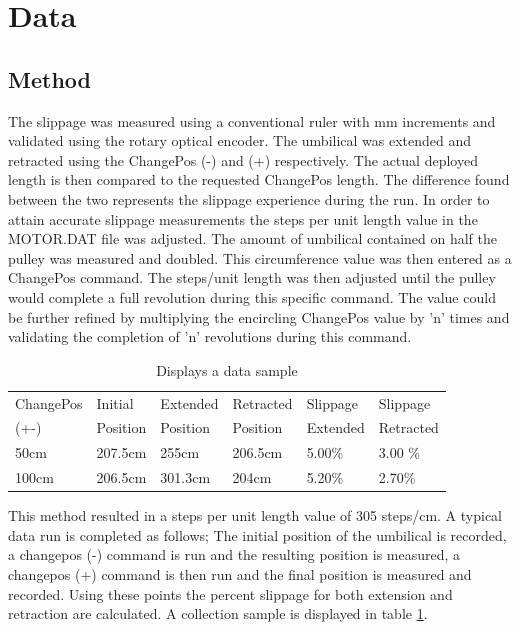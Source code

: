 \documentclass[paper=a4, fontsize=11pt]{scrartcl}
\numberwithin{equation}{section}		%
\numberwithin{figure}{section}			%
\numberwithin{table}{section}				%
\begin{document}
\section{Data}
\subsection{Method}
The slippage was measured using a conventional ruler with mm increments and validated using the rotary optical encoder. The umbilical was extended and retracted using the ChangePos (-) and (+) respectively. The actual deployed length is then compared to the requested ChangePos length. The difference found between the two represents the slippage experience during the run. In order to attain accurate slippage measurements the steps per unit length value in the MOTOR.DAT file was adjusted. The amount of umbilical contained on half the pulley was measured and doubled. This circumference value was then entered as a ChangePos command. The steps/unit length was then adjusted until the pulley would complete a full revolution during this specific command. The value could be further refined by multiplying the encircling ChangePos value by 'n' times and validating the completion of 'n' revolutions during this command. 

\begin{table}[H]
\begin{tabularx}{\textwidth}{ |X|X|X|X|X|X| }
\hline
ChangePos  & Initial  & Extended  & Retracted  & Slippage  & Slippage \\ 
 (+-) & Position & Position & Position & Extended & Retracted \\
\hline
50cm &	 207.5cm & 	255cm & 	206.5cm &	5.00\%  &	3.00 \%	
 \\
\hline
100cm &	206.5cm	& 301.3cm	& 204cm &	5.20\% & 	2.70\%	\\
\hline

\end{tabularx}
\caption{Displays a data sample }
\label{data}
\end{table}

This method resulted in a steps per unit length value of 305 steps/cm. A typical data run is completed as follows; The initial position of the umbilical is recorded, a changepos (-) command is run and the resulting position is measured, a changepos (+) command is then run and the final position is measured and recorded. Using these points the percent slippage for both extension and retraction are calculated. A collection sample is displayed in table \ref{data}.
\end{document}
